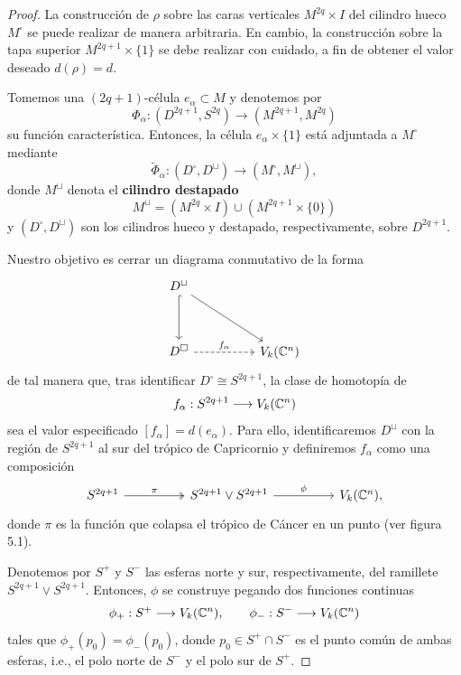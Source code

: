 \begin{proof}
La construcción de $\rho$ sobre las caras verticales $M^{2q} \times I$ del cilindro hueco $M^\square$ se puede realizar de manera arbitraria. En cambio, la construcción sobre la tapa superior $M^{2q+1} \times \{ 1 \}$ se debe realizar con cuidado, a fin de obtener el valor deseado $d(\rho) = d$.

Tomemos una $(2q+1)$-célula $e_\alpha \subset M$ y denotemos por
$$\Phi_\alpha : (D^{2q+1}, S^{2q}) \longrightarrow (M^{2q+1}, M^{2q})$$
su función característica. Entonces, la célula $e_\alpha \times \{ 1 \}$ está adjuntada a $M^\square$ mediante
$$\widetilde \Phi_\alpha : (D^\square, D^\sqcup) \longrightarrow (M^\square, M^\sqcup),$$
donde $M^\sqcup$ denota el \textbf{cilindro destapado}
$$M^\sqcup = (M^{2q} \times I) \cup (M^{2q+1} \times \{ 0 \})$$
y $(D^\square, D^\sqcup)$ son los cilindros hueco y destapado, respectivamente, sobre $D^{2q+1}$.

Nuestro objetivo es cerrar un diagrama conmutativo de la forma
$$
\begin{tikzcd}[row sep = huge, column sep = huge]
    D^\sqcup \arrow[d, hook] \arrow[rd, ""] \\
    D^\square \arrow[r, dashed, "f_\alpha"] & V_k(\C^n)
\end{tikzcd}
$$
de tal manera que, tras identificar $D^\square \cong S^{2q+1}$, la clase de homotopía de
$$f_\alpha : S^{2q+1} \longrightarrow V_k(\mathbb C^n)$$
sea el valor especificado $[f_\alpha] = d(e_\alpha)$. Para ello, identificaremos $D^\sqcup$ con la región de $S^{2q+1}$ al sur del trópico de Capricornio y definiremos $f_\alpha$ como una composición
$$
\begin{tikzcd}[row sep = huge, column sep = huge]
    S^{2q+1} \arrow[r, two heads, "\pi"]
        & S^{2q+1} \vee S^{2q+1} \arrow[r, "\phi"]
        & V_k(\C^n),
\end{tikzcd}
$$
donde $\pi$ es la función que colapsa el trópico de Cáncer en un punto (ver figura 5.1).

Denotemos por $S^+$ y $S^-$ las esferas norte y sur, respectivamente, del ramillete $S^{2q+1} \vee S^{2q+1}$. Entonces, $\phi$ se construye pegando dos funciones continuas
$$\phi_+ : S^+ \longrightarrow V_k(\mathbb C^n), \qquad \phi_- : S^- \longrightarrow V_k(\mathbb C^n)$$
tales que $\phi_+(p_0) = \phi_-(p_0)$, donde $p_0 \in S^+ \cap S^-$ es el punto común de ambas esferas, i.e., el polo norte de $S^-$ y el polo sur de $S^+$.


\end{proof}
